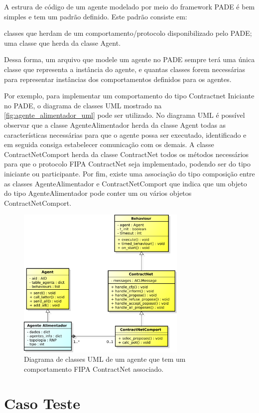 \documentclass[journal]{IEEEtran}
\begin{document}
A estrura de código de um agente modelado por meio do framework PADE é bem simples e tem um padrão definido. Este padrão consiste em:

classes que herdam de um comportamento/protocolo disponibilizado pelo PADE;
uma classe que herda da classe Agent.

Dessa forma, um arquivo que modele um agente no PADE sempre terá uma única classe que representa a instância do agente, e quantas classes forem necessárias para representar instâncias dos comportamentos definidos para os agentes.

Por exemplo, para implementar um comportamento do tipo Contractnet Iniciante no PADE, o diagrama de classes UML mostrado na \autoref{fig:agente_alimentador_uml} pode ser utilizado. No diagrama UML é possível observar que a classe AgenteAlimentador herda da classe Agent todas as características necessárias para que o agente possa ser executado, identificado e em seguida consiga estabelecer comunicação com os demais. A classe ContractNetComport herda da classe ContractNet todos os métodos necessários para que o protocolo FIPA ContractNet seja implementado, podendo ser do tipo iniciante ou participante. Por fim, existe uma associação do tipo composição entre as classes AgenteAlimentador e ContractNetComport que indica que um objeto do tipo AgenteAlimentador pode conter um ou vários objetos ContractNetComport.

\begin{figure}[!htb]
    \centering
    \includegraphics[width=3.2in]{Figuras/agente_alimentador.eps}
    \caption{\label{fig:agente_alimentador_uml} Diagrama de classes UML de um agente que tem um comportamento FIPA ContractNet associado.}
\end{figure}

\section{Caso Teste}
\end{document}
